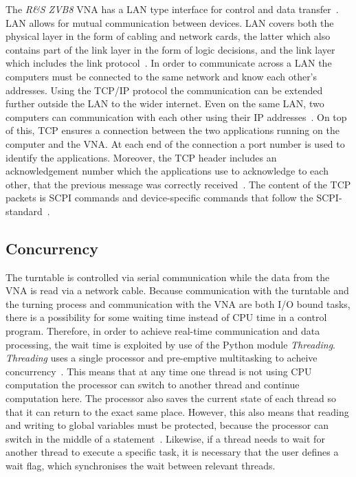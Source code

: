 The \textit{R\&S ZVB8} VNA has a LAN type interface for control and data transfer~\cite{vna_data_sheet_descrip}. LAN allows for mutual communication between devices. LAN covers both the physical layer in the form of cabling and network cards, the latter which also contains part of the link layer in the form of logic decisions, and the link layer which includes the link protocol~\cite[p. 153]{tcp_ip}. In order to communicate across a LAN the computers must be connected to the same network and know each other's addresses. Using the TCP/IP protocol the communication can be extended further outside the LAN to the wider internet. Even on the same LAN, two computers can communication with each other using their IP addresses~\cite[p. 174-175]{tcp_ip}. On top of this, TCP ensures a connection between the two applications running on the computer and the VNA. At each end of the connection a port number is used to identify the applications. Moreover, the TCP header includes an acknowledgement number which the applications use to acknowledge to each other, that the previous message was correctly received~\cite[p. 313]{tcp_ip}. The content of the TCP packets is SCPI commands and device-specific commands that follow the SCPI-standard~\cite[p. 5.4]{vna_operating_manual}.



\subsection{Concurrency}
The turntable is controlled via serial communication while the data from the VNA is read via a network cable. Because communication with the turntable and the turning process and communication with the VNA are both I/O bound tasks, there is a possibility for some waiting time instead of CPU time in a control program. Therefore, in order to achieve real-time communication and data processing, the wait time is exploited by use of the Python module \textit{Threading}. \textit{Threading} uses a single processor and pre-emptive multitasking to acheive concurrency~\cite{concurrency}. This means that at any time one thread is not using CPU computation the processor can switch to another thread and continue computation here. The processor also saves the current state of each thread so that it can return to the exact same place. However, this also means that reading and writing to global variables must be protected, because the processor can switch in the middle of a statement~\cite{concurrency}. Likewise, if a thread needs to wait for another thread to execute a specific task, it is necessary that the user defines a wait flag, which synchronises the wait between relevant threads.

